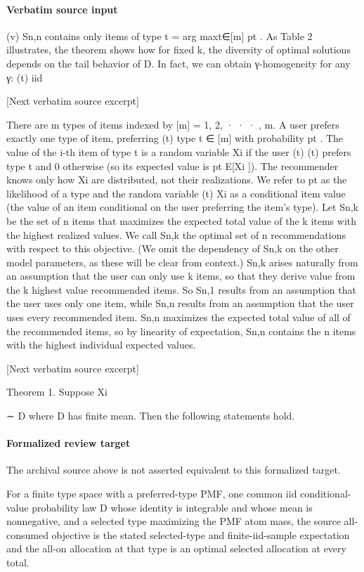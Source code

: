 \documentclass[10pt]{article}
\begin{document}
\paragraph{Verbatim source input}
\begin{ReviewVerbatim}
(v) Sn,n contains only items of type t = arg maxt∈[m] pt .
As Table 2 illustrates, the theorem shows how for fixed k, the diversity of optimal solutions depends on
the tail behavior of D. In fact, we can obtain γ-homogeneity for any γ:
(t) iid

[Next verbatim source excerpt]

There are m types of items indexed by [m] = {1, 2, · · · , m}. A user prefers exactly one type of item, preferring
(t)
type t ∈ [m] with probability pt . The value of the i-th item of type t is a random variable Xi if the user
(t)
(t)
prefers type t and 0 otherwise (so its expected value is pt E[Xi ]). The recommender knows only how Xi
are distributed, not their realizations. We refer to pt as the likelihood of a type and the random variable
(t)
Xi as a conditional item value (the value of an item conditional on the user preferring the item’s type).
Let Sn,k be the set of n items that maximizes the expected total value of the k items with the highest
realized values. We call Sn,k the optimal set of n recommendations with respect to this objective. (We omit
the dependency of Sn,k on the other model parameters, as these will be clear from context.)
Sn,k arises naturally from an assumption that the user can only use k items, so that they derive value
from the k highest value recommended items. So Sn,1 results from an assumption that the user uses only
one item, while Sn,n results from an assumption that the user uses every recommended item.
Sn,n maximizes the expected total value of all of the recommended items, so by linearity of expectation,
Sn,n contains the n items with the highest individual expected values.

[Next verbatim source excerpt]

Theorem 1. Suppose Xi

∼ D where D has finite mean. Then the following statements hold.
\end{ReviewVerbatim}


\paragraph{Formalized review target}
The archival source above is not asserted equivalent to this formalized target.
\begin{ReviewVerbatim}
For a finite type space with a preferred-type PMF, one common iid conditional-value probability law D whose identity is integrable and whose mean is nonnegative, and a selected type maximizing the PMF atom mass, the source all-consumed objective is the stated selected-type and finite-iid-sample expectation and the all-on allocation at that type is an optimal selected allocation at every total.
\end{ReviewVerbatim}
\end{document}
